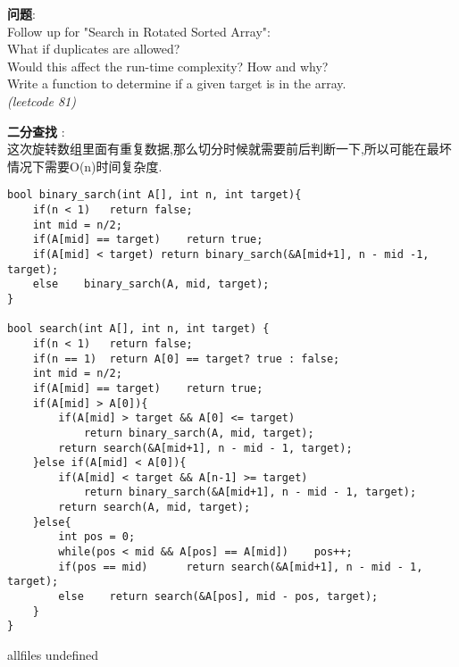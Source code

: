 \documentclass{article}
\begin{document}
\begin{CJK}{UTF8}{gbsn}     %

\else
    
\begin{description}
    \item{\textbf{问题}}:\\
Follow up for "Search in Rotated Sorted Array":\\
What if duplicates are allowed?\\
Would this affect the run-time complexity? How and why?\\
Write a function to determine if a given target is in the array.\\
 \textit{(leetcode 81)}
    \item{\textbf{二分查找}} : 
    \\这次旋转数组里面有重复数据,那么切分时候就需要前后判断一下,所以可能在最坏情况下需要O(n)时间复杂度.
    \begin{lstlisting}
bool binary_sarch(int A[], int n, int target){
	if(n < 1)	return false;
	int mid = n/2;
	if(A[mid] == target)	return true;
	if(A[mid] < target)	return binary_sarch(&A[mid+1], n - mid -1, target);
	else	binary_sarch(A, mid, target);
}

bool search(int A[], int n, int target) {
	if(n < 1)	return false;
	if(n == 1)	return A[0] == target? true : false;
	int mid = n/2;
	if(A[mid] == target)	return true;
	if(A[mid] > A[0]){
		if(A[mid] > target && A[0] <= target)
			return binary_sarch(A, mid, target);
		return search(&A[mid+1], n - mid - 1, target);
	}else if(A[mid] < A[0]){
		if(A[mid] < target && A[n-1] >= target)
			return binary_sarch(&A[mid+1], n - mid - 1, target);
		return search(A, mid, target);
	}else{
		int pos = 0;
		while(pos < mid && A[pos] == A[mid])	pos++;
		if(pos == mid)		return search(&A[mid+1], n - mid - 1, target);
		else	return search(&A[pos], mid - pos, target);
	}
}
    \end{lstlisting}
    \textit{}
\end{description}

\fi

\ifx allfiles undefined
\end{CJK}
\end{document}
